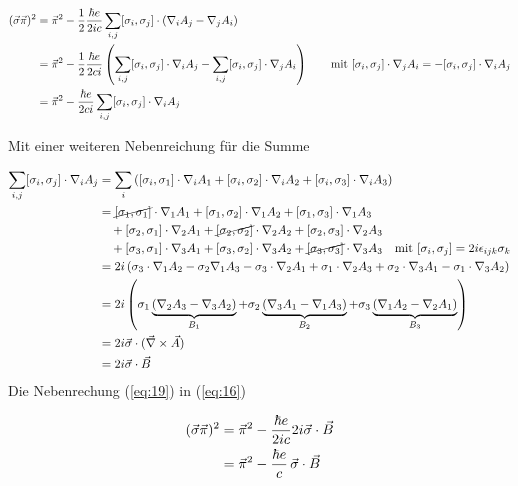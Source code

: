 \begin{align}
  \label{eq:16}
   (\vec\sigma\vec\pi)^2 &= \vec\pi^2 - \frac{1}{2} \frac{\hbar e}{2ic} \sum_{i,j} [\sigma_i,\sigma_j]\cdot\left( \nabla_i A_j  - \nabla_j A_i\right) \notag\\
&= \vec\pi^2 - \frac{1}{2} \frac{\hbar e}{2ci} \left( \sum_{i,j} [\sigma_i,\sigma_j]\cdot \nabla_i A_j  - \sum_{i,j} [\sigma_i,\sigma_j]\cdot\nabla_j A_i\right) \qquad\text{mit }[\sigma_i,\sigma_j]\cdot\nabla_j A_i=-[\sigma_i,\sigma_j]\cdot\nabla_i A_j \notag\\
&= \vec\pi^2 -  \frac{\hbar e}{2ci} \sum_{i,j} [\sigma_i,\sigma_j]\cdot\nabla_i A_j
\end{align}

Mit einer weiteren Nebenreichung für die Summe

\begin{align}
  \label{eq:19}
  \sum_{i,j} [\sigma_i,\sigma_j]\cdot\nabla_i A_j &= \sum_i\left( [\sigma_i,\sigma_1]\cdot\nabla_i A_1+[\sigma_i,\sigma_2]\cdot\nabla_i A_2+[\sigma_i,\sigma_3]\cdot\nabla_i A_3\right) \notag\\  
&=  \cancel{[\sigma_1,\sigma_1]}\cdot\nabla_1 A_1+[\sigma_1,\sigma_2]\cdot\nabla_1 A_2+[\sigma_1,\sigma_3]\cdot\nabla_1 A_3 \notag\\ 
 &\quad+[\sigma_2,\sigma_1]\cdot\nabla_2 A_1+\cancel{[\sigma_2,\sigma_2]}\cdot\nabla_2 A_2+[\sigma_2,\sigma_3]\cdot\nabla_2 A_3 \notag\\ 
 &\quad+ [\sigma_3,\sigma_1]\cdot\nabla_3 A_1+[\sigma_3,\sigma_2]\cdot\nabla_3 A_2+\cancel{[\sigma_3,\sigma_3]}\cdot\nabla_3 A_3 \quad \text{mit }[\sigma_i,\sigma_j] = 2i\epsilon_{ijk}\sigma_k \notag\\
&= 2i\left( \sigma_3\cdot\nabla_1 A_2 - \sigma_2\nabla_1 A_3 -\sigma_3\cdot\nabla_2 A_1+ \sigma_1\cdot\nabla_2 A_3 + \sigma_2\cdot\nabla_3 A_1-\sigma_1\cdot\nabla_3 A_2 \right)\notag\\
&= 2i\left(\sigma_1\underbr{(\nabla_2 A_3-\nabla_3 A_2)}_{B_1} + \sigma_2\underbr{(\nabla_3 A_1- \nabla_1 A_3)}_{B_2} +  \sigma_3\underbr{(\nabla_1 A_2-\nabla_2 A_1)}_{B_3}\right)\notag\\
&= 2i\vec\sigma\cdot(\vec\nabla\times\vec A)\notag\\
&=2i\vec\sigma\cdot\vec B
\end{align}
Die Nebenrechung (\ref{eq:19}) in (\ref{eq:16})

\begin{align}
  \label{eq:16.1}
(\vec\sigma\vec\pi)^2  &= \vec\pi^2 -  \frac{\hbar e}{2ic} 2i\vec\sigma\cdot\vec B \notag\\
&= \vec\pi^2 -  \frac{\hbar e}{c}\, \vec \sigma\cdot\vec B 
\end{align}

